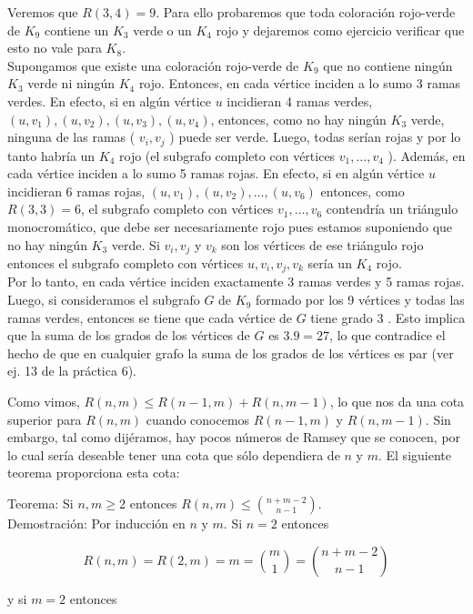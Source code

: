 \documentclass[10pt]{article}
\begin{document}
Veremos que $R(3,4)=9$. Para ello probaremos que toda coloración rojo-verde de $K_{9}$ contiene un $K_{3}$ verde o un $K_{4}$ rojo y dejaremos como ejercicio verificar que esto no vale para $K_{8}$.\\
Supongamos que existe una coloración rojo-verde de $K_{9}$ que no contiene ningún $K_{3}$ verde ni ningún $K_{4}$ rojo. Entonces, en cada vértice inciden a lo sumo 3 ramas verdes. En efecto, si en algún vértice $u$ incidieran 4 ramas verdes, $\left(u, v_{1}\right),\left(u, v_{2}\right),\left(u, v_{3}\right),\left(u, v_{4}\right)$, entonces, como no hay ningún $K_{3}$ verde, ninguna de las ramas ( $v_{i}, v_{j}$ ) puede ser verde. Luego, todas serían rojas y por lo tanto habría un $K_{4}$ rojo (el subgrafo completo con vértices $v_{1}, \ldots, v_{4}$ ). Además, en cada vértice inciden a lo sumo 5 ramas rojas. En efecto, si en algún vértice $u$ incidieran 6 ramas rojas, $\left(u, v_{1}\right),\left(u, v_{2}\right), \ldots,\left(u, v_{6}\right)$ entonces, como $R(3,3)=6$, el subgrafo completo con vértices $v_{1}, \ldots, v_{6}$ contendría un triángulo monocromático, que debe ser necesariamente rojo pues estamos suponiendo que no hay ningún $K_{3}$ verde. Si $v_{i}, v_{j}$ y $v_{k}$ son los vértices de ese triángulo rojo entonces el subgrafo completo con vértices $u, v_{i}, v_{j}, v_{k}$ sería un $K_{4}$ rojo.\\
Por lo tanto, en cada vértice inciden exactamente 3 ramas verdes y 5 ramas rojas. Luego, si consideramos el subgrafo $G$ de $K_{9}$ formado por los 9 vértices y todas las ramas verdes, entonces se tiene que cada vértice de $G$ tiene grado 3 . Esto implica que la suma de los grados de los vértices de $G$ es $3.9=27$, lo que contradice el hecho de que en cualquier grafo la suma de los grados de los vértices es par (ver ej. 13 de la práctica 6).

Como vimos, $R(n, m) \leq R(n-1, m)+R(n, m-1)$, lo que nos da una cota superior para $R(n, m)$ cuando conocemos $R(n-1, m)$ y $R(n, m-1)$. Sin embargo, tal como dijéramos, hay pocos números de Ramsey que se conocen, por lo cual sería deseable tener una cota que sólo dependiera de $n$ y $m$. El siguiente teorema proporciona esta cota:

Teorema: Si $n, m \geq 2$ entonces $R(n, m) \leq\binom{ n+m-2}{n-1}$.\\
Demostración: Por inducción en $n$ y $m$. Si $n=2$ entonces

$$
R(n, m)=R(2, m)=m=\binom{m}{1}=\binom{n+m-2}{n-1}
$$

y si $m=2$ entonces
\end{document}
